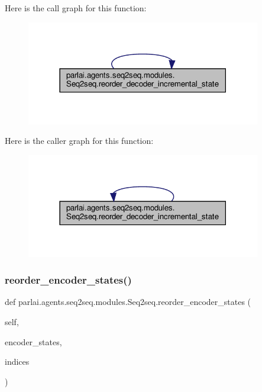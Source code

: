 Here is the call graph for this function\+:
\nopagebreak
\begin{figure}[H]
\begin{center}
\leavevmode
\includegraphics[width=290pt]{classparlai_1_1agents_1_1seq2seq_1_1modules_1_1Seq2seq_a8503e583661f0d824e0aa070b3d6ff42_cgraph}
\end{center}
\end{figure}
Here is the caller graph for this function\+:
\nopagebreak
\begin{figure}[H]
\begin{center}
\leavevmode
\includegraphics[width=290pt]{classparlai_1_1agents_1_1seq2seq_1_1modules_1_1Seq2seq_a8503e583661f0d824e0aa070b3d6ff42_icgraph}
\end{center}
\end{figure}
\mbox{\label{classparlai_1_1agents_1_1seq2seq_1_1modules_1_1Seq2seq_a8161e20a5368471c58ec73e74ba35f48}} 
\subsubsection{\texorpdfstring{reorder\+\_\+encoder\+\_\+states()}{reorder\_encoder\_states()}}
{\footnotesize\ttfamily def parlai.\+agents.\+seq2seq.\+modules.\+Seq2seq.\+reorder\+\_\+encoder\+\_\+states (\begin{DoxyParamCaption}\item[{}]{self,  }\item[{}]{encoder\+\_\+states,  }\item[{}]{indices }\end{DoxyParamCaption})}

